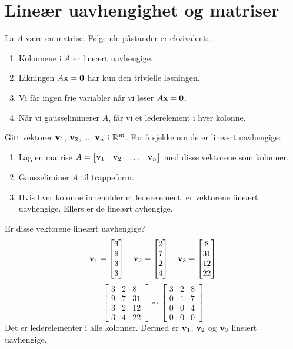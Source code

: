 \begin{ex}
\end{ex}


\section*{Lineær uavhengighet og matriser}

\begin{thm}
La $A$ være en matrise.  Følgende påstander er ekvivalente:
\begin{enumerate}
\item Kolonnene i $A$ er lineært uavhengige.
\item Likningen $A \mathbf{x} = \mathbf{0}$ har kun den trivielle løsningen.
\item Vi får ingen frie variabler når vi løser $A \mathbf{x} = \mathbf{0}$.
\item Når vi gausseliminerer $A$, får vi et lederelement i hver kolonne.
\end{enumerate}
\end{thm}

Gitt vektorer $\mathbf{v}_1$, $\mathbf{v}_2$, \ldots, $\mathbf{v}_n$ i $\mathbb{R}^m$.  For å
sjekke om de er lineært uavhengige:
\begin{enumerate}
\item Lag en matrise
$A = \begin{bmatrix} \mathbf{v}_1 & \mathbf{v}_2 & \ldots &
\mathbf{v}_n \end{bmatrix}$ med disse vektorene som kolonner.
\item Gausseliminer $A$ til trappeform.
\item Hvis hver kolonne inneholder et lederelement, er vektorene lineært uavhengige.
Ellers er de lineært avhengige.
\end{enumerate}


\begin{ex}
Er disse vektorene lineært uavhengige?
\[
\mathbf{v}_1 = \begin{bmatrix} 3 \\ 9 \\ 3 \\ 3 \end{bmatrix}\quad
\mathbf{v}_2 = \begin{bmatrix} 2 \\ 7 \\ 2 \\ 4 \end{bmatrix}\quad
\mathbf{v}_3 = \begin{bmatrix} 8 \\ 31 \\ 12 \\ 22 \end{bmatrix}
\]
\[
\begin{bmatrix}
3 & 2 & 8 \\
9 & 7 & 31 \\
3 & 2 & 12 \\
3 & 4 & 22
\end{bmatrix}
\sim
\begin{bmatrix}
3 & 2 & 8 \\
0 & 1 & 7 \\
0 & 0 & 4 \\
0 & 0 & 0
\end{bmatrix}
\]
Det er lederelementer i alle kolonner.  Dermed er $\mathbf{v}_1$,
$\mathbf{v}_2$ og $\mathbf{v}_3$ lineært uavhengige.
\end{ex}


